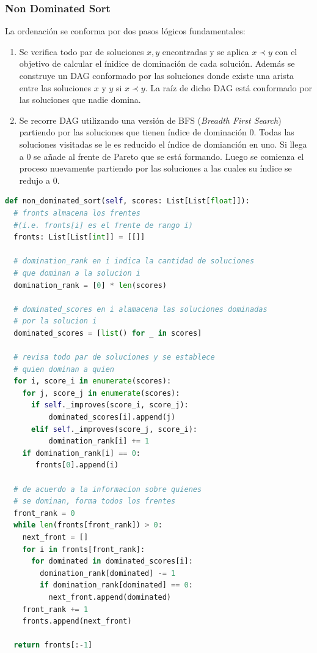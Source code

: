 \subsubsection{Non Dominated Sort}
La ordenaci\'on se conforma por dos pasos l\'ogicos fundamentales:
\begin{enumerate}
    \item Se verifica todo par de soluciones $x, y$ encontradas y se aplica $x \prec y$ con el objetivo de calcular el \'inidice de dominaci\'on de cada soluci\'on. Adem\'as se construye un DAG conformado por las soluciones donde existe una arista entre las soluciones $x$ y $y$ si $x \prec y$. La ra\'iz de dicho DAG est\'a conformado por las soluciones que nadie domina.
    \item Se recorre DAG utilizando una versi\'on de BFS (\textit{Breadth First Search}) partiendo por las soluciones que tienen \'indice de dominaci\'on 0. Todas las soluciones visitadas se le es reducido el \'indice de domianci\'on en uno. Si llega a 0 se a\~nade al frente de Pareto que se est\'a formando. Luego se comienza el proceso nuevamente partiendo por las soluciones a las cuales su \'indice se redujo a 0.
\end{enumerate}

\begin{lstlisting}[caption=Non Dominated Sorting, language=Python]
def non_dominated_sort(self, scores: List[List[float]]):
  # fronts almacena los frentes 
  #(i.e. fronts[i] es el frente de rango i)
  fronts: List[List[int]] = [[]]

  # domination_rank en i indica la cantidad de soluciones
  # que dominan a la solucion i
  domination_rank = [0] * len(scores)

  # dominated_scores en i alamacena las soluciones dominadas
  # por la solucion i
  dominated_scores = [list() for _ in scores]

  # revisa todo par de soluciones y se establece
  # quien dominan a quien
  for i, score_i in enumerate(scores):
    for j, score_j in enumerate(scores):
      if self._improves(score_i, score_j):
          dominated_scores[i].append(j)
      elif self._improves(score_j, score_i):
          domination_rank[i] += 1
    if domination_rank[i] == 0:
       fronts[0].append(i)

  # de acuerdo a la informacion sobre quienes
  # se dominan, forma todos los frentes
  front_rank = 0
  while len(fronts[front_rank]) > 0:
    next_front = []
    for i in fronts[front_rank]:
      for dominated in dominated_scores[i]:
        domination_rank[dominated] -= 1
        if domination_rank[dominated] == 0:
          next_front.append(dominated)
    front_rank += 1
    fronts.append(next_front)

  return fronts[:-1]
\end{lstlisting}

